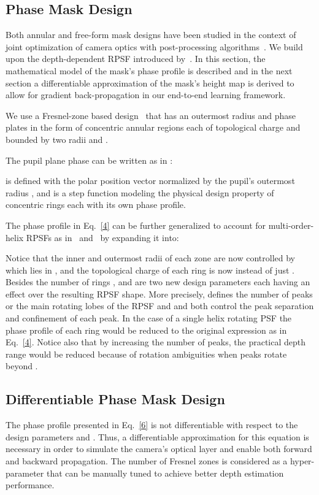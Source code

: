 \documentclass[preprint,5p,twocolumn]{elsarticle}
\begin{document}
\subsection{Phase Mask Design}
\label{subsec:mask_design}


Both annular and free-form mask designs have been studied in the context of joint optimization of camera optics with post-processing algorithms~\cite{haim2018depth,wu2019phasecam3d,chang2019deep}. We build upon the depth-dependent RPSF introduced by~\cite{prasad2013rotating}. In this section, the mathematical model of the mask's phase profile is described and in the next section a differentiable approximation of the mask's height map is derived to allow for gradient back-propagation in our end-to-end learning framework.

We use a Fresnel-zone based design~\cite{prasad2013rotating} that has an outermost radius  and  phase plates in the form of concentric annular regions each of topological charge  and bounded by two radii  and .

The pupil plane phase can be written as in \cite{prasad2013rotating}:



 is defined with the polar position vector  normalized by the pupil's outermost radius , and is a step function modeling the physical design property of concentric rings each  with its own phase profile. 

The phase profile in Eq.~\ref{4} can be further generalized to account for multi-order-helix RPSFs as in~\cite{kumar2015three} and~\cite{berlich2018high} by expanding it into:



Notice that the inner and outermost radii of each zone are now controlled by  which lies in , and the topological charge of each ring is now  instead of just . Besides the number of rings ,  and  are two new design parameters each having an effect over the resulting RPSF shape. More precisely,  defines the number of peaks or the main rotating lobes of the RPSF and  and  both control the peak separation and confinement of each peak. In the case of a single helix rotating PSF   the phase profile of each ring would be reduced to the original expression as in Eq.~\ref{4}. Notice also that by increasing the number of peaks, the practical depth range would be reduced because of rotation ambiguities when peaks rotate beyond .


\subsection{Differentiable Phase Mask Design}
\label{subsec:diff_mask_design}
The phase profile presented in Eq.~\ref{6} is not differentiable with respect to the design parameters  and . Thus, a differentiable approximation for this equation is necessary in order to simulate the camera's optical layer and enable both forward and backward propagation. The number of Fresnel zones  is considered as a hyper-parameter that can be manually tuned to achieve better depth estimation performance.
\end{document}
